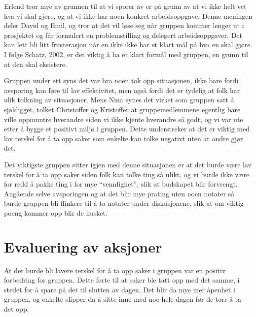 Erlend tror mye av grunnen til at vi sporer av er på grunn av at vi ikke helt vet hva vi skal gjøre, og at vi ikke har noen konkret arbeidsoppgave. Denne meningen deler David og Emil, og tror at det vil løse seg når gruppen kommer lenger ut i prosjektet og får formulert en problemstilling og delegert arbeidsoppgaver. Det kan lett bli litt frusterasjon når en ikke ikke har et klart mål på hva en skal gjøre. I følge Schatz, 2002, er det viktig å ha et klart formål med gruppen, en grunn til at den skal eksistere.

Gruppen under ett syns det var bra noen tok opp situasjonen, ikke bare fordi avsporing kan føre til lav effektivitet, men også fordi det er tydelig at folk har ulik tolkning av situasjoner. Mens Nina synes det virket som gruppen satt å sjøldigget, tolket Christoffer og Kristoffer at gruppemedlemmene egentlig bare ville oppmuntre hverandre siden vi ikke kjente hverandre så godt, og vi var ute etter å bygge et positivt miljø i gruppen. Dette understreker at det er viktig med lav terskel for å ta opp saker som enkelte kan tolke negativt uten at andre gjør det.

Det viktigste gruppen sitter igjen med denne situasjonen er at det burde være lav terskel for å ta opp saker siden folk kan tolke ting så ulikt, og vi burde ikke være for redd å pakke ting i for mye “vennlighet”, slik at budskapet blir forvrengt. Angående selve avsporingen og at det blir mye prating uten noen notater så burde gruppen bli flinkere til å ta notater under diskusjonene, slik at om viktig poeng kommer opp blir de husket.
\section{Evaluering av aksjoner}
At det burde bli lavere terskel for å ta opp saker i gruppen var en positiv forbedring for gruppen. Dette førte til at saker ble tatt opp med det samme, i stedet for å spare på det til slutten av dagen. Det blir da mye mer åpenhet i gruppen, og enkelte slipper da å sitte inne med noe hele dagen før de tørr å ta det opp.
